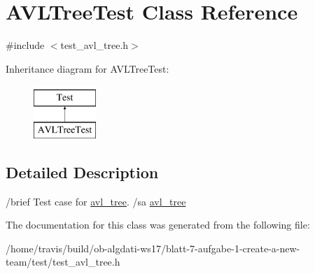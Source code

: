 \hypertarget{classAVLTreeTest}{\section{A\-V\-L\-Tree\-Test Class Reference}
\label{classAVLTreeTest}
}


{\ttfamily \#include $<$test\-\_\-avl\-\_\-tree.\-h$>$}

Inheritance diagram for A\-V\-L\-Tree\-Test\-:\begin{figure}[H]
\begin{center}
\leavevmode
\includegraphics[height=2.000000cm]{classAVLTreeTest}
\end{center}
\end{figure}


\subsection{Detailed Description}
/brief Test case for \hyperlink{classavl__tree}{avl\-\_\-tree}. /sa \hyperlink{classavl__tree}{avl\-\_\-tree} 

The documentation for this class was generated from the following file\-:\begin{DoxyCompactItemize}
\item 
/home/travis/build/ob-\/algdati-\/ws17/blatt-\/7-\/aufgabe-\/1-\/create-\/a-\/new-\/team/test/test\-\_\-avl\-\_\-tree.\-h\end{DoxyCompactItemize}

